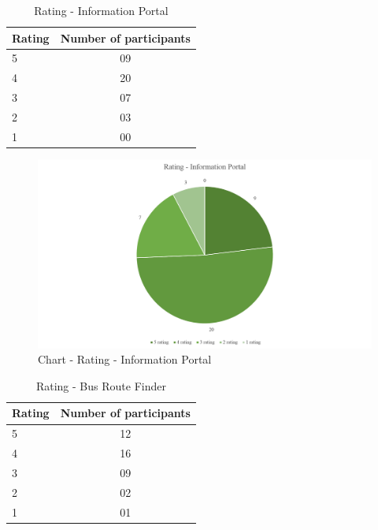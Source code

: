 \documentclass[12pt, oneside]{report}
\begin{document}
\begin {itemize}
\begin{table} [h]
\centering
\begin{tabular}{|l|c|}
\hline
Rating & Number of participants \\
\hline
5	&09 \\
4	&20 \\
3	&07 \\
2	&03 \\
1	&00 \\
\hline
\end{tabular}
\caption{Rating - Information Portal}
\label{table-survey-rating-InformationPortal}
\end{table}

\begin {figure} [h]
\centering
\includegraphics [scale=0.5] {ratingInformationPortal}
\caption [Chart - Rating - Information Portal] {Chart - Rating - Information Portal}
\label {image-ratingInformationPortal}
\end {figure}

\begin{table} [h]
\centering
\begin{tabular}{|l|c|}
\hline
Rating & Number of participants \\
\hline
5	&12 \\
4	&16 \\
3	&09 \\
2	&02 \\
1	&01 \\
\hline
\end{tabular}
\caption{Rating - Bus Route Finder}
\label{table-survey-rating-BusRouteFinder}
\end{table}


\end{itemize}
\end{document}
